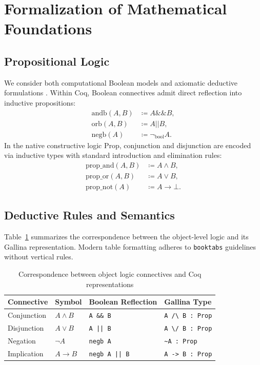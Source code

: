 \section{Formalization of Mathematical Foundations}
\label{sec:formalization}

\subsection{Propositional Logic}
\label{subsec:prop_logic}

We consider both computational Boolean models and axiomatic deductive formulations \cite{vereshchagin2002lectures}. Within Coq, Boolean connectives admit direct reflection into inductive propositions:
\begin{align}
\mathrm{andb}(A, B) &\coloneqq A \mathbin{\&\&} B, \\
\mathrm{orb}(A, B)  &\coloneqq A \mathbin{||} B, \\
\mathrm{negb}(A)     &\coloneqq \lnot_{\mathrm{bool}} A.
\end{align}
In the native constructive logic $\mathrm{Prop}$, conjunction and disjunction are encoded via inductive types with standard introduction and elimination rules:
\begin{align}
\mathrm{prop\_and}(A, B) &\coloneqq A \land B, \\
\mathrm{prop\_or}(A, B)  &\coloneqq A \lor B, \\
\mathrm{prop\_not}(A)    &\coloneqq A \to \bot.
\end{align}

\subsection{Deductive Rules and Semantics}
\label{subsec:semantics}

Table~\ref{tab:logic_connectives} summarizes the correspondence between the object-level logic and its Gallina representation. Modern table formatting adheres to \texttt{booktabs} guidelines without vertical rules.

\begin{table}[htbp]
\centering
\caption{Correspondence between object logic connectives and Coq representations}
\label{tab:logic_connectives}
\begin{tabular}{llll}
\toprule
\textbf{Connective} & \textbf{Symbol} & \textbf{Boolean Reflection} & \textbf{Gallina Type} \\
\midrule
Conjunction & $A \land B$ & \texttt{A \&\& B} & \texttt{A /\textbackslash{} B : Prop} \\
Disjunction & $A \lor B$ & \texttt{A || B} & \texttt{A \textbackslash{}/ B : Prop} \\
Negation    & $\lnot A$ & \texttt{negb A} & \texttt{\textasciitilde{}A : Prop} \\
Implication & $A \to B$ & \texttt{negb A || B} & \texttt{A -> B : Prop} \\
\bottomrule
\end{tabular}
\end{table}

